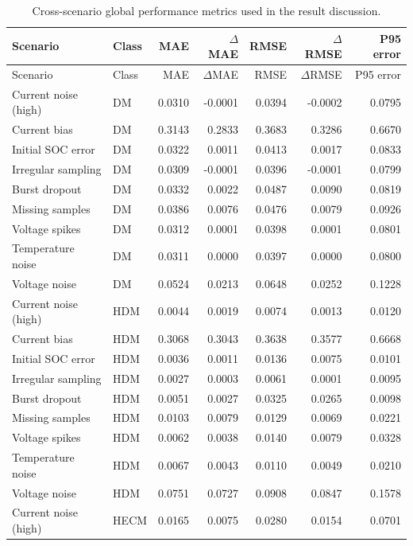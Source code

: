 \documentclass[review,nopreprintline]{elsarticle}
\begin{document}
\begin{longtable}{llrrrrr}
\caption{Cross-scenario global performance metrics used in the result discussion.}\label{tab:appendix_key_results}\\
\toprule
Scenario & Class & MAE & $\Delta$MAE & RMSE & $\Delta$RMSE & P95 error \\
\midrule
\endfirsthead
\toprule
Scenario & Class & MAE & $\Delta$MAE & RMSE & $\Delta$RMSE & P95 error \\
\midrule
\endhead
Current noise (high) & DM & 0.0310 & -0.0001 & 0.0394 & -0.0002 & 0.0795 \\
Current bias & DM & 0.3143 & 0.2833 & 0.3683 & 0.3286 & 0.6670 \\
Initial SOC error & DM & 0.0322 & 0.0011 & 0.0413 & 0.0017 & 0.0833 \\
Irregular sampling & DM & 0.0309 & -0.0001 & 0.0396 & -0.0001 & 0.0799 \\
Burst dropout & DM & 0.0332 & 0.0022 & 0.0487 & 0.0090 & 0.0819 \\
Missing samples & DM & 0.0386 & 0.0076 & 0.0476 & 0.0079 & 0.0926 \\
Voltage spikes & DM & 0.0312 & 0.0001 & 0.0398 & 0.0001 & 0.0801 \\
Temperature noise & DM & 0.0311 & 0.0000 & 0.0397 & 0.0000 & 0.0800 \\
Voltage noise & DM & 0.0524 & 0.0213 & 0.0648 & 0.0252 & 0.1228 \\
Current noise (high) & HDM & 0.0044 & 0.0019 & 0.0074 & 0.0013 & 0.0120 \\
Current bias & HDM & 0.3068 & 0.3043 & 0.3638 & 0.3577 & 0.6668 \\
Initial SOC error & HDM & 0.0036 & 0.0011 & 0.0136 & 0.0075 & 0.0101 \\
Irregular sampling & HDM & 0.0027 & 0.0003 & 0.0061 & 0.0001 & 0.0095 \\
Burst dropout & HDM & 0.0051 & 0.0027 & 0.0325 & 0.0265 & 0.0098 \\
Missing samples & HDM & 0.0103 & 0.0079 & 0.0129 & 0.0069 & 0.0221 \\
Voltage spikes & HDM & 0.0062 & 0.0038 & 0.0140 & 0.0079 & 0.0328 \\
Temperature noise & HDM & 0.0067 & 0.0043 & 0.0110 & 0.0049 & 0.0210 \\
Voltage noise & HDM & 0.0751 & 0.0727 & 0.0908 & 0.0847 & 0.1578 \\
Current noise (high) & HECM & 0.0165 & 0.0075 & 0.0280 & 0.0154 & 0.0701 \\

\end{longtable}
\end{document}
